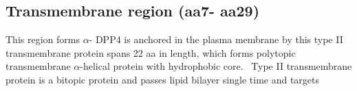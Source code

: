 \subsection{Transmembrane region (aa7- aa29)}

This region forms $\alpha$-
DPP4 is anchored in the plasma membrane by this type II transmembrane protein spans 22 aa in length, which forms polytopic transmembrane $\alpha$-helical protein with hydrophobic core.~\cite{Hong_1990} Type II transmembrane protein is a bitopic protein and passes lipid bilayer single time and targets 



